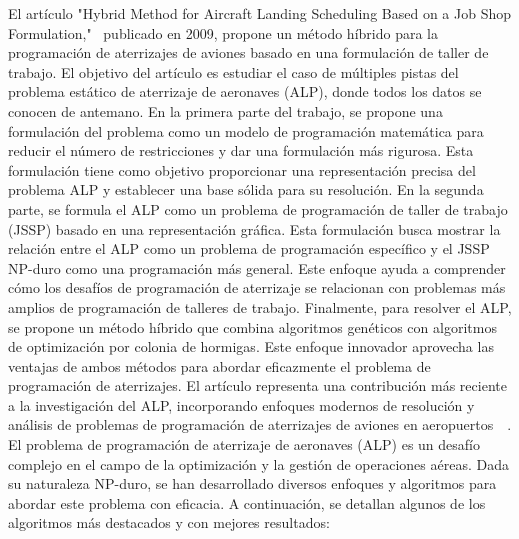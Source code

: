 \documentclass[letter, 10pt]{article}
\begin{document}
El art\'iculo "Hybrid Method for Aircraft Landing Scheduling Based on a Job Shop Formulation,"~\cite{Bencheikh2009} publicado en 2009, propone un m\'etodo h\'ibrido para la programaci\'on de aterrizajes de aviones basado en una formulaci\'on de taller de trabajo. El objetivo del art\'iculo es estudiar el caso de m\'ultiples pistas del problema est\'atico de aterrizaje de aeronaves (ALP), donde todos los datos se conocen de antemano. En la primera parte del trabajo, se propone una formulaci\'on del problema como un modelo de programaci\'on matem\'atica para reducir el n\'umero de restricciones y dar una formulaci\'on m\'as rigurosa. Esta formulaci\'on tiene como objetivo proporcionar una representaci\'on precisa del problema ALP y establecer una base s\'olida para su resoluci\'on. En la segunda parte, se formula el ALP como un problema de programaci\'on de taller de trabajo (JSSP) basado en una representaci\'on gr\'afica. Esta formulaci\'on busca mostrar la relaci\'on entre el ALP como un problema de programaci\'on espec\'ifico y el JSSP NP-duro como una programaci\'on m\'as general. Este enfoque ayuda a comprender c\'omo los desaf\'ios de programaci\'on de aterrizaje se relacionan con problemas m\'as amplios de programaci\'on de talleres de trabajo. Finalmente, para resolver el ALP, se propone un m\'etodo h\'ibrido que combina algoritmos gen\'eticos con algoritmos de optimizaci\'on por colonia de hormigas. Este enfoque innovador aprovecha las ventajas de ambos m\'etodos para abordar eficazmente el problema de programaci\'on de aterrizajes. El art\'iculo representa una contribuci\'on m\'as reciente a la investigaci\'on del ALP, incorporando enfoques modernos de resoluci\'on y an\'alisis de problemas de programaci\'on de aterrizajes de aviones en aeropuertos~\cite{Bencheikh2009}~\cite{Colorni1994}. \\

El problema de programaci\'on de aterrizaje de aeronaves (ALP) es un desaf\'io complejo en el campo de la optimizaci\'on y la gesti\'on de operaciones a\'ereas. Dada su naturaleza NP-duro, se han desarrollado diversos enfoques y algoritmos para abordar este problema con eficacia. A continuaci\'on, se detallan algunos de los algoritmos m\'as destacados y con mejores resultados:
\end{document}
